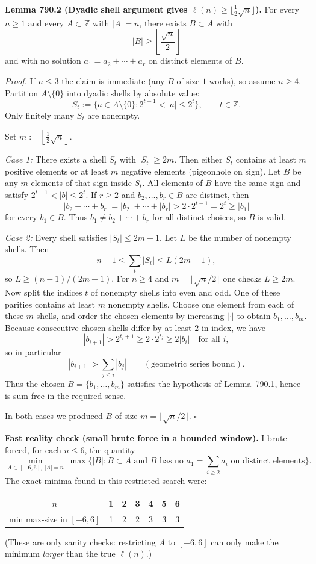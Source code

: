 \medskip
\textbf{Lemma 790.2 (Dyadic shell argument gives $\ell(n)\ge \lfloor \tfrac12\sqrt n\rfloor$).}
For every $n\ge 1$ and every $A\subset\mathbb Z$ with $|A|=n$, there exists $B\subset A$ with
\[
|B|\ge \left\lfloor \frac{\sqrt n}{2}\right\rfloor
\]
and with no solution $a_1=a_2+\cdots+a_r$ on distinct elements of $B$.

\emph{Proof.}
If $n\le 3$ the claim is immediate (any $B$ of size $1$ works), so assume $n\ge 4$.
Partition $A\setminus\{0\}$ into dyadic shells by absolute value:
\[
S_t := \{a\in A\setminus\{0\}: 2^{t-1} < |a| \le 2^t\},\qquad t\in\mathbb Z.
\]
Only finitely many $S_t$ are nonempty.

Set $m:=\left\lfloor \tfrac12\sqrt n\right\rfloor$.

\emph{Case 1:} There exists a shell $S_t$ with $|S_t|\ge 2m$.
Then either $S_t$ contains at least $m$ positive elements or at least $m$ negative elements (pigeonhole on sign).
Let $B$ be any $m$ elements of that sign inside $S_t$.
All elements of $B$ have the same sign and satisfy $2^{t-1}<|b|\le 2^t$.
If $r\ge 2$ and $b_2,\dots,b_r\in B$ are distinct, then
\[
|b_2+\cdots+b_r| = |b_2|+\cdots+|b_r| > 2\cdot 2^{t-1} = 2^t \ge |b_1|
\]
for every $b_1\in B$. Thus $b_1\ne b_2+\cdots+b_r$ for all distinct choices, so $B$ is valid.

\emph{Case 2:} Every shell satisfies $|S_t|\le 2m-1$.
Let $L$ be the number of nonempty shells. Then
\[
 n-1 \le \sum_t |S_t| \le L(2m-1),
\]
so $L\ge (n-1)/(2m-1)$. For $n\ge 4$ and $m=\lfloor \sqrt n/2\rfloor$ one checks $L\ge 2m$.
Now split the indices $t$ of nonempty shells into even and odd. One of these parities contains at least $m$ nonempty shells.
Choose one element from each of these $m$ shells, and order the chosen elements by increasing $|\cdot|$ to obtain $b_1,\dots,b_m$.
Because consecutive chosen shells differ by at least $2$ in index, we have
\[
|b_{i+1}| > 2^{t_i+1} \ge 2\cdot 2^{t_i} \ge 2|b_i|\quad\text{for all }i,
\]
so in particular
\[
|b_{i+1}| > \sum_{j\le i} |b_j|\qquad(\text{geometric series bound}).
\]
Thus the chosen $B=\{b_1,\dots,b_m\}$ satisfies the hypothesis of Lemma~790.1, hence is sum-free in the required sense.

In both cases we produced $B$ of size $m=\lfloor \sqrt n/2\rfloor$. \hfill$\square$

\medskip
\textbf{Fast reality check (small brute force in a bounded window).}
I brute-forced, for each $n\le 6$, the quantity
\[
\min_{A\subset[-6,6],\ |A|=n}\ \max\{|B|: B\subset A\text{ and }B\text{ has no }a_1=\sum_{i\ge 2}a_i\text{ on distinct elements}\}.
\]
The exact minima found in this restricted search were:
\begin{center}
\begin{tabular}{c|cccccc}
$n$ & 1 & 2 & 3 & 4 & 5 & 6\\\hline
min max-size in $[-6,6]$ & 1 & 2 & 2 & 3 & 3 & 3
\end{tabular}
\end{center}
(These are only sanity checks: restricting $A$ to $[-6,6]$ can only make the minimum \emph{larger} than the true $\ell(n)$.)

